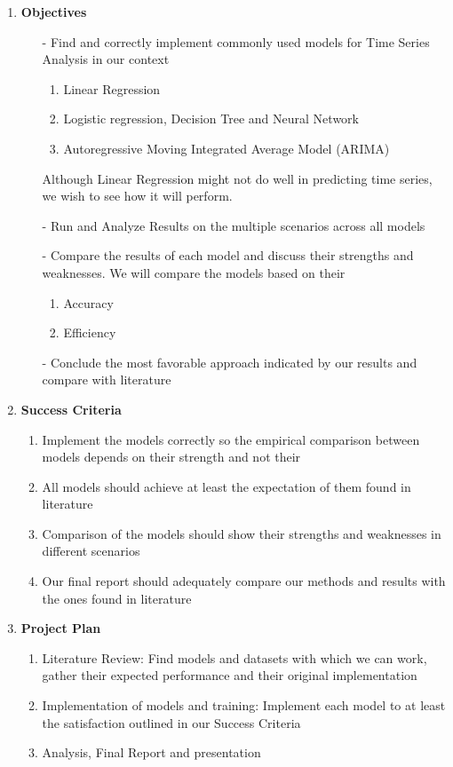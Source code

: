 \documentclass[12pt, letterpaper]{article}
\begin{document}
\begin{enumerate}[label=]
    \item \textbf{Objectives }
        \begin{itemize}
            \item[-] Find and correctly implement commonly used models for Time Series Analysis in our context
              \begin{enumerate}[label=\alph*.]
              \item Linear Regression
              \item Logistic regression, Decision Tree and Neural Network
              \item Autoregressive Moving Integrated Average Model (ARIMA)
              \end{enumerate}
              Although Linear Regression might not do well in predicting time series, we wish to see how it will perform.
            \item[-] Run and Analyze Results on the multiple scenarios across all models
            \item[-] Compare the results of each model and discuss their strengths and weaknesses. We will compare the models based on their
              \begin{enumerate}[label=\alph*.]
                \item Accuracy
                \item Efficiency
              \end{enumerate}
            \item[-] Conclude the most favorable approach indicated by our results and compare with literature
        \end{itemize} 
    \item \textbf{Success Criteria}
        \begin{enumerate}[label=-]
            \item Implement the models correctly so the empirical comparison between models depends on their strength and not their
            \item All models should achieve at least the expectation of them found in literature
            \item Comparison of the models should show their strengths and weaknesses in different scenarios
            \item Our final report should adequately compare our methods and results with the ones found in literature
        \end{enumerate} 
        
    \item \textbf{Project Plan} %
        \begin{enumerate}[label=-]
            \item Literature Review: Find models and datasets with which we can work, gather their expected performance and their original implementation
            \item Implementation of models and training: Implement each model to at least the satisfaction outlined in our Success Criteria
            \item Analysis, Final Report and presentation
        \end{enumerate}
    

\end{enumerate}
\end{document}
